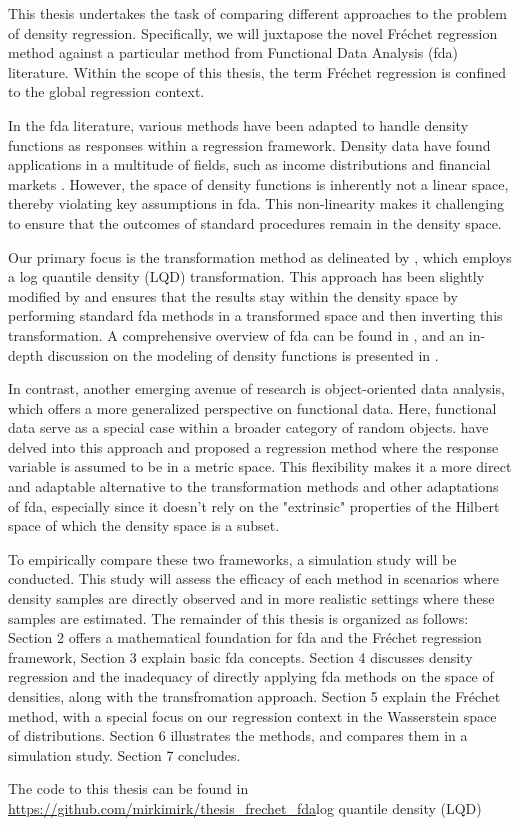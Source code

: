 This thesis undertakes the task of comparing different approaches to 
the problem of density regression. Specifically, we will juxtapose the 
novel Fréchet regression method against a particular method from Functional Data 
Analysis (fda) literature. Within the scope of this thesis, the term Fréchet 
regression is confined to the global regression context.

In the fda literature, various methods have been adapted to handle density 
functions as responses within a regression framework. Density data have found 
applications in a multitude of fields, such as income distributions 
\parencite{HildenbrandKneipUtikal1999,KneipUtikal2001} and financial markets \parencite{KokoszkaEtAl2019}. 
However, the space of density functions is inherently not a linear space, thereby 
violating key assumptions in fda. This non-linearity makes it challenging to 
ensure that the outcomes of standard procedures remain in the density space.

Our primary focus is the transformation method as delineated by 
\textcite{PetersenMüller2016}, which employs a log quantile density (LQD) 
transformation. This approach has been slightly modified by \textcite{KokoszkaEtAl2019}
and ensures that the results stay within the density space by performing standard 
fda methods in a transformed space and then inverting this transformation. A 
comprehensive overview of fda can be found in \textcite{WangChiouMüller2016}, 
and an in-depth discussion on the modeling of density functions is presented in 
\textcite{PetersenZhangKokoszka2022}.

In contrast, another emerging avenue of research is object-oriented data analysis, 
which offers a more generalized perspective on functional data. Here, functional 
data serve as a special case within a broader category of random objects. 
\textcite{PetersenMüller2019} have delved into this approach and proposed a 
regression method where the response variable is assumed to be in a metric space. 
This flexibility makes it a more direct and adaptable alternative to the 
transformation methods and other adaptations of fda, especially since it doesn't 
rely on the "extrinsic" properties of the Hilbert space of which the density space 
is a subset.

To empirically compare these two frameworks, a simulation study will be conducted. 
This study will assess the efficacy of each method in scenarios where density samples 
are directly observed and in more realistic settings where these samples are estimated. 
The remainder of this thesis is organized as follows: Section 2 offers a mathematical 
foundation for fda and the Fréchet regression framework, Section 3 explain basic fda
concepts. Section 4 discusses density regression and the inadequacy of directly applying
fda methods on the space of densities, along with the transfromation approach. Section 5
explain the Fréchet method, with a special focus on our regression context in the Wasserstein
space of distributions. Section 6 illustrates the methods, and compares them in a simulation study.
Section 7 concludes.

The code to this thesis can be found in \url{https://github.com/mirkimirk/thesis_frechet_fda}log quantile density (LQD)
